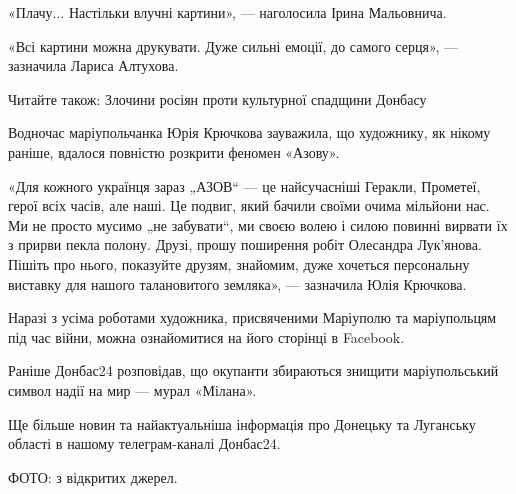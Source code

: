 «Плачу... Настільки влучні картини», — наголосила Ірина Мальовнича.

«Всі картини можна друкувати. Дуже сильні емоції, до самого серця», — зазначила
Лариса Алтухова.

Читайте також: Злочини росіян проти культурної спадщини Донбасу

Водночас маріупольчанка Юрія Крючкова зауважила, що художнику, як нікому
раніше, вдалося повністю розкрити феномен «Азову».

«Для кожного українця зараз „АЗОВ“ — це найсучасніші Геракли, Прометеї, герої
всіх часів, але наші. Це подвиг, який бачили своїми очима мільйони нас. Ми не
просто мусимо „не забувати“, ми своєю волею і силою повинні вирвати їх з прирви
пекла полону. Друзі, прошу поширення робіт Олесандра Лук'янова. Пішіть про
нього, показуйте друзям, знайомим, дуже хочеться персональну виставку для
нашого талановитого земляка», — зазначила Юлія Крючкова.

Наразі з усіма роботами художника, присвяченими Маріуполю та маріупольцям під
час війни, можна ознайомитися на його сторінці в Facebook.

Раніше Донбас24 розповідав, що окупанти збираються знищити маріупольський
символ надії на мир — мурал «Мілана».

Ще більше новин та найактуальніша інформація про Донецьку та Луганську області
в нашому телеграм-каналі Донбас24.

ФОТО: з відкритих джерел.
